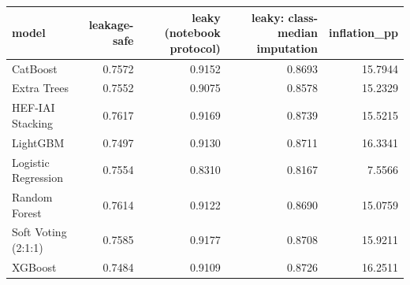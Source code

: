 \begin{tabular}{lrrrr}
\toprule
model & leakage-safe & leaky (notebook protocol) & leaky: class-median imputation & inflation\_pp \\
\midrule
CatBoost & 0.7572 & 0.9152 & 0.8693 & 15.7944 \\
Extra Trees & 0.7552 & 0.9075 & 0.8578 & 15.2329 \\
HEF-IAI Stacking & 0.7617 & 0.9169 & 0.8739 & 15.5215 \\
LightGBM & 0.7497 & 0.9130 & 0.8711 & 16.3341 \\
Logistic Regression & 0.7554 & 0.8310 & 0.8167 & 7.5566 \\
Random Forest & 0.7614 & 0.9122 & 0.8690 & 15.0759 \\
Soft Voting (2:1:1) & 0.7585 & 0.9177 & 0.8708 & 15.9211 \\
XGBoost & 0.7484 & 0.9109 & 0.8726 & 16.2511 \\
\bottomrule
\end{tabular}
